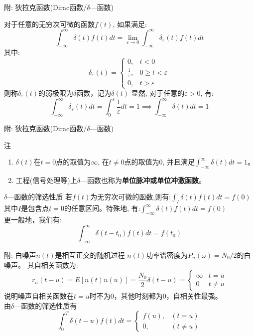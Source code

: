 \begin{frame}{附: 狄拉克函数(Dirac函数/$\delta$---函数)}
\begin{definition}[$\delta$---函数]
	对于任意的无穷次可微的函数$f(t)$, 如果满足:
	$$\int_{-\infty}^{\infty}\delta (t)f(t)dt=\lim\limits_{\varepsilon\to 0}\int_{-\infty}^{\infty}\delta_{\varepsilon}(t)f(t)dt $$
	其中:
	\[
	\delta_{\varepsilon}(t)=\begin{cases}
	0,&t<0\\
	\frac{1}{\varepsilon}, & 0\ge t<\varepsilon\\
	0, &t>\varepsilon
	\end{cases}
	\]
	则称$\delta_\varepsilon(t)$的弱极限为$\delta$函数，记为$\delta(t)$
	显然, 对于任意的$\varepsilon>0$, 有:
	$$\int_{-\infty}^{\infty}\delta_{\varepsilon}(t)dt=\int_{0}^{\varepsilon}\frac{1}{\varepsilon}dt=1\implies \int_{-\infty}^\infty\delta(t)dt=1$$
\end{definition}
\end{frame}

\begin{frame}{附: 狄拉克函数(Dirac函数/$\delta$---函数)}
\begin{block}{注}
\begin{enumerate}
	\item $\delta(t)$在$t=0$点的取值为$\infty$, 在$t\ne 0$点的取值为0, 并且满足$\int_{-\infty}^{\infty}\delta(t)dt=1$。
	\item 工程(信号处理等)上$\delta$---函数也称为\textbf{单位脉冲或单位冲激函数}。
\end{enumerate}
\end{block}
\begin{block}{$\delta$---函数的筛选性质}
若$f(t)$为无穷次可微的函数,则有:$\int_{I}\delta(t)f(t)dt=f(0) $\\
其中$I$是包含点$t=0$的任意区间。特殊地, 有:$\int_{-\infty}^{\infty}\delta(t)f(t)dt=f(0) $\\
更一般地，我们有:
$$\int_{-\infty}^{\infty}\delta(t-t_0)f(t)dt=f(t_0) $$
\end{block}
\end{frame}

\begin{frame}[shrink]{附: 白噪声$n(t)$是相互正交的随机过程}
$n(t)$功率谱密度为$P_n(\omega)=N_0/2$的白噪声。
其自相关函数为: 
\[r_n(t-u)=E[n(t)n(u)]=\frac{N_0}{2}\delta(t-u)=
\begin{cases}
\infty & t=u\\
0 &t\ne u
\end{cases}  
\] 
说明噪声自相关函数在$t=u$时不为0，其他时刻都为0，自相关性最强。\\
由$\delta$---函数的筛选性质有
\[
\int_0^T\delta(t-u)f(t)dt=
\begin{cases}
	f(u), & (t=u)\\
	0, & (t\ne u) 
\end{cases}
\]
\end{frame}

